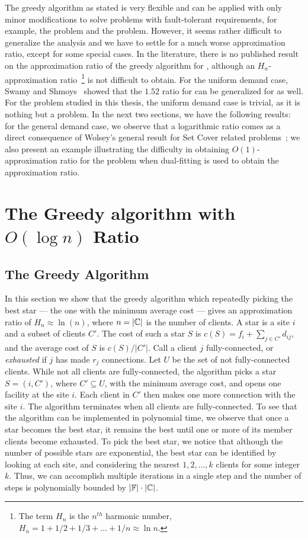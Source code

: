 \documentclass[oneside,final]{ucr}
\begin{document}
The greedy algorithm as stated is very flexible and can be
applied with only minor modifications to solve problems with
fault-tolerant requirements, for example, the {\FTFL}
problem and the {\FTFP} problem. However, it seems rather
difficult to generalize the analysis and we have to settle
for a much worse approximation ratio, except for some
special cases. In the literature, there is no published
result on the approximation ratio of the greedy algorithm
for {\FTFL}, although an $H_n$-approximation
ratio~\footnote{The term $H_n$ is the $n^{th}$ harmonic
  number, $H_n = 1 + 1/2 + 1/3 + \ldots + 1/n \approx \ln
  n$.} is not difficult to obtain. For the uniform demand
case, Swamy and Shmoys~\cite{SwamyS08} showed that the
$1.52$ ratio for {\UFL} can be generalized for {\FTFL} as
well. For the {\FTFP} problem studied in this thesis, the
uniform demand case is trivial, as it is nothing but a
{\UFL} problem. In the next two sections, we have the
following results: for the general demand case, we observe
that a logarithmic ratio comes as a direct consequence of
Wolsey's general result for Set Cover related
problems~\cite{Wolsey88}; we also present an example
illustrating the difficulty in obtaining
$O(1)$-approximation ratio for the {\FTFP} problem when
dual-fitting is used to obtain the approximation ratio.

\section{The Greedy algorithm with $O(\log n)$ Ratio}
\label{sec: greedy_ratio}

\subsection{The Greedy Algorithm}
In this section we show that the greedy algorithm which
repeatedly picking the best star --- the one with the
minimum average cost --- gives an approximation ratio of
$H_n \approx \ln(n)$, where $n=|\mathbb{C}|$ is the number
of clients. A star is a site $i$ and a subset of clients
$C'$. The cost of such a star $S$ is $c(S) = f_i +
\sum_{j\in C'} d_{ij}$, and the average cost of $S$ is $c(S)
/ |C'|$. Call a client $j$ fully-connected, or
\emph{exhausted} if $j$ has made $r_j$ connections. Let $U$
be the set of not fully-connected clients. While not all
clients are fully-connected, the algorithm picks a star
$S=(i,C')$, where $C' \subseteq U$, with the minimum average
cost, and opens one facility at the site $i$. Each client in
$C'$ then makes one more connection with the site $i$. The
algorithm terminates when all clients are
fully-connected. To see that the algorithm can be
implemented in polynomial time, we observe that once a star
becomes the best star, it remains the best until one or more
of its member clients become exhausted. To pick the best
star, we notice that although the number of possible stars
are exponential, the best star can be identified by looking
at each site, and considering the nearest $1,2,\ldots,k$
clients for some integer $k$. Thus, we can accomplish
multiple iterations in a single step and the number of steps
is polynomially bounded by $|\mathbb{F}|\cdot|\mathbb{C}|$.
\end{document}
